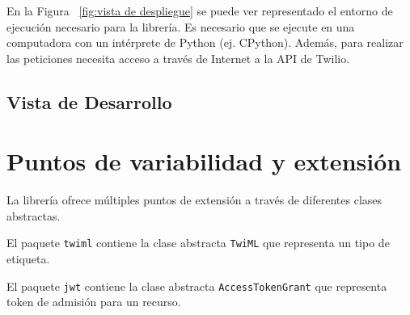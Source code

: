 \documentclass{article}
\begin{document}
\begin{center}
\label{fig:vista de despliegue}
\end{center}

\hfill

En la Figura ~\ref{fig:vista de despliegue}
se puede ver representado el entorno de ejecución
necesario para la librería.
Es necesario que se ejecute en una computadora
con un intérprete de Python (ej. CPython).
Además, para realizar las peticiones necesita acceso
a través de Internet a la API de Twilio.

\subsection{Vista de Desarrollo}


\section{Puntos de variabilidad y extensión}

La librería ofrece múltiples puntos de extensión
a través de diferentes clases abstractas.

El paquete \verb|twiml| contiene la clase abstracta \verb|TwiML|
que representa un tipo de etiqueta.

El paquete \verb|jwt| contiene la clase abstracta \verb|AccessTokenGrant|
que representa token de admisión para un recurso.
\end{document}
